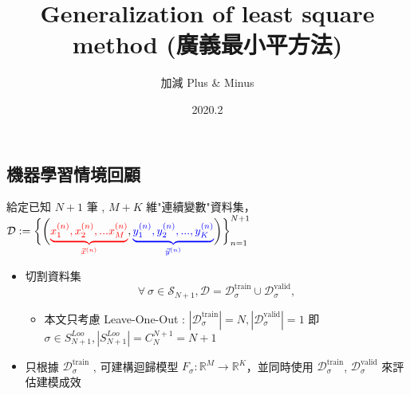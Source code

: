 \documentclass{article}
\begin{document}
\begin{CJK}{UTF8}{bsmi}


\title{Generalization of least square method (廣義最小平方法) }
\date{2020.2}
\author{加減 Plus \& Minus}




\maketitle

\section{機器學習情境回顧}
給定已知 $N+1$ 筆 , $M+K$ 維"連續變數"資料集， $ \mathcal{D}:= \bigg\{\bigg({\color{red}\underbrace{x^{(n)}_1,x^{(n)}_2,...x^{(n)}_M}_{\vec{x}^{(n)}}},{\color{blue}\underbrace{y_{1}^{(n)},y_{2}^{(n)},...,y_{K}^{(n)}}_{\vec{y}^{(n)}}}\bigg)\bigg\}_{n=1}^{N+1}$
\begin{itemize}

\item $\text{切割資料集}$ $$ \forall \  \sigma \in \mathcal{S}_{N+1} , \mathcal{D} =\mathcal{D}^{\text{train}}_{\sigma} \cup \mathcal{D}^{\text{valid}}_{\sigma} ,  $$
\begin{itemize}
\item 本文只考慮 \color{red} Leave-One-Out : $|\mathcal{D}^{\text{train}}_{\sigma}| = N ,  |\mathcal{D}^{\text{valid}}_{\sigma}| = 1  $ 即　$\sigma \in S^{Loo}_{N+1} , |S^{Loo}_{N+1}| = C^{N+1}_{N} = N+1$
\end{itemize}
\item 只根據 $\mathcal{D}^{\text{train}}_{\sigma}$ , 可建構迴歸模型 $F_{\sigma} : \mathbb{R}^{M} \longrightarrow \mathbb{R}^{K} $，並同時使用 $\mathcal{D}^{\text{train}}_{\sigma}$, $\mathcal{D}^{\text{valid}}_{\sigma}$  來評估建模成效


\end{itemize}
\end{CJK}
\end{document}
